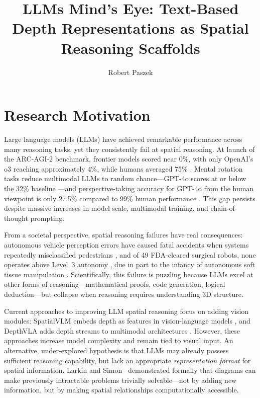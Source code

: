 \documentclass[stu,12pt,a4paper,floatsintext]{apa7}
\title{LLMs Mind's Eye: Text-Based Depth Representations as Spatial Reasoning Scaffolds}
\author{Robert Paszek}
\affiliation{Department of Cognitive Science and Artificial Intelligence, Tilburg University}
\begin{document}
\maketitle

\section*{Research Motivation}

Large language models (LLMs) have achieved remarkable performance across many reasoning tasks, yet they consistently fail at spatial reasoning. At launch of the ARC-AGI-2 benchmark, frontier models scored near 0\%, with only OpenAI's o3 reaching approximately 4\%, while humans averaged 75\% \cite{chollet2025}. Mental rotation tasks reduce multimodal LLMs to random chance---GPT-4o scores at or below the 32\% baseline \cite{stogiannidis2025}---and perspective-taking accuracy for GPT-4o from the human viewpoint is only 27.5\% compared to 99\% human performance \cite{shiri2024}. This gap persists despite massive increases in model scale, multimodal training, and chain-of-thought prompting.

From a societal perspective, spatial reasoning failures have real consequences: autonomous vehicle perception errors have caused fatal accidents when systems repeatedly misclassified pedestrians \cite{ntsb2019}, and of 49 FDA-cleared surgical robots, none operates above Level~3 autonomy \cite{lee2024}, due in part to the infancy of autonomous soft tissue manipulation \cite{khanna2025}. Scientifically, this failure is puzzling because LLMs excel at other forms of reasoning---mathematical proofs, code generation, logical deduction---but collapse when reasoning requires understanding 3D structure.

Current approaches to improving LLM spatial reasoning focus on adding vision modules: SpatialVLM embeds depth as features in vision-language models \cite{chen2024spatialvlm}, and DepthVLA adds depth streams to multimodal architectures \cite{yuan2025depthvla}. However, these approaches increase model complexity and remain tied to visual input. An alternative, under-explored hypothesis is that LLMs may already possess sufficient reasoning capability, but lack an appropriate \emph{representation format} for spatial information. Larkin and Simon~\cite{larkin1987} demonstrated formally that diagrams can make previously intractable problems trivially solvable---not by adding new information, but by making spatial relationships computationally accessible.
\end{document}
